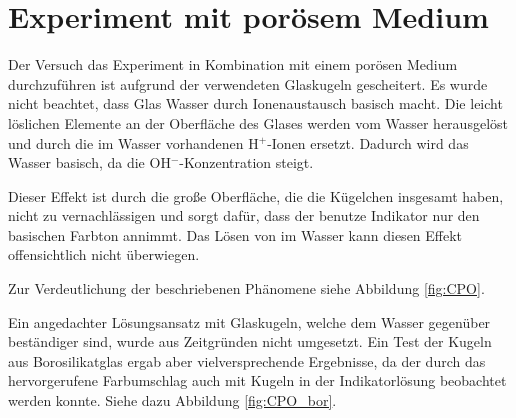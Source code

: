 \twocolumn


\section{\COTm Experiment mit porösem Medium}
\label{res:cpm}



Der Versuch das \COT Experiment in Kombination mit einem porösen Medium durchzuführen ist aufgrund der verwendeten Glaskugeln gescheitert. Es wurde nicht beachtet, dass Glas Wasser durch Ionenaustausch basisch macht. Die leicht löslichen Elemente an der Oberfläche des Glases werden vom Wasser herausgelöst und durch die im Wasser vorhandenen H$^+$-Ionen ersetzt. Dadurch wird das Wasser basisch, da die OH$^-$-Konzentration steigt. \citep{Vogel}

Dieser Effekt ist durch die große Oberfläche, die die Kügelchen insgesamt haben, nicht zu vernachlässigen und sorgt dafür, dass der benutze Indikator nur den basischen Farbton annimmt. Das Lösen von \COT im Wasser kann diesen Effekt offensichtlich nicht überwiegen.

Zur Verdeutlichung der beschriebenen Phänomene siehe Abbildung \ref{fig:CPO}.

Ein angedachter Lösungsansatz mit Glaskugeln, welche dem Wasser gegenüber beständiger sind, wurde aus Zeitgründen nicht umgesetzt. Ein Test der Kugeln aus Borosilikatglas ergab aber vielversprechende Ergebnisse, da der durch das \COT hervorgerufene Farbumschlag auch mit Kugeln in der Indikatorlösung beobachtet werden konnte. Siehe dazu Abbildung \ref{fig:CPO_bor}.




